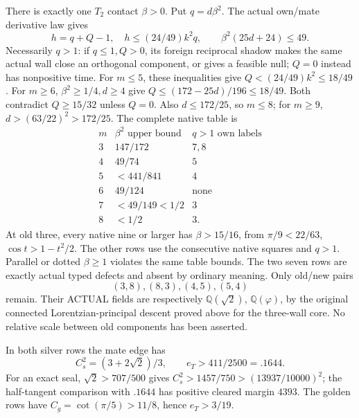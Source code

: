 \documentclass[11pt]{article}
\begin{document}
There is exactly one \(T_2\) contact
\(\beta>0\).
Put \(q=d\beta^2\).
The actual own/mate derivative law gives
\[
 h=q+Q-1,\quad h\le(24/49)k^2q,\qquad
                         \beta^2(25d+24)\le49 .
\]
Necessarily \(q>1\): if \(q\le1,Q>0\),
its foreign reciprocal shadow makes the
same actual wall close an orthogonal
component, or gives a feasible null;
\(Q=0\) instead has nonpositive time.
For \(m\le5\), these inequalities give
\(Q<(24/49)k^2\le18/49\).
For \(m\ge6\), \(\beta^2\ge1/4,d\ge4\)
give \(Q\le(172-25d)/196\le18/49\).
Both contradict \(Q\ge15/32\) unless
\(Q=0\).
Also \(d\le172/25\), so \(m\le8\);
for \(m\ge9\),
\(d>(63/22)^2>172/25\).
The complete native table is
\[
 \begin{array}{c|c|c}
 m&\beta^2\text{ upper bound}&q>1\text{ own labels}\\ \hline
 3&147/172&7,8\\
 4&49/74&5\\
 5&<441/841&4\\
 6&49/124&\text{none}\\
 7&<49/149<1/2&3\\
 8&<1/2&3 .
 \end{array}
\]
At old three, every native nine or larger
has \(\beta>15/16\), from
\(\pi/9<22/63\), \(\cos t>1-t^2/2\).
The other rows use the consecutive native
squares and \(q>1\).
Parallel or dotted \(\beta\ge1\) violates
the same table bounds.
The two seven rows are exactly actual
typed defects and absent by ordinary meaning.
Only old/new pairs
\[
                    (3,8),(8,3),(4,5),(5,4)
\]
remain.
Their ACTUAL fields are respectively
\(\mathbb Q(\sqrt2)\), \(\mathbb Q(\varphi)\),
by the original connected Lorentzian-principal
descent proved above for the three-wall core.
No relative scale between old components
has been asserted.

In both silver rows the mate edge has
\[
 C_s^2=(3+2\sqrt2)/3,\qquad e_T>411/2500=.1644 .
\]
For an exact seal, \(\sqrt2>707/500\)
gives \(C_s^2>1457/750>(13937/10000)^2\);
the half-tangent comparison with \(.1644\)
has positive cleared margin \(4393\).
The golden rows have
\(C_g=\cot(\pi/5)>11/8\), hence
\(e_T>3/19\).
\end{document}

